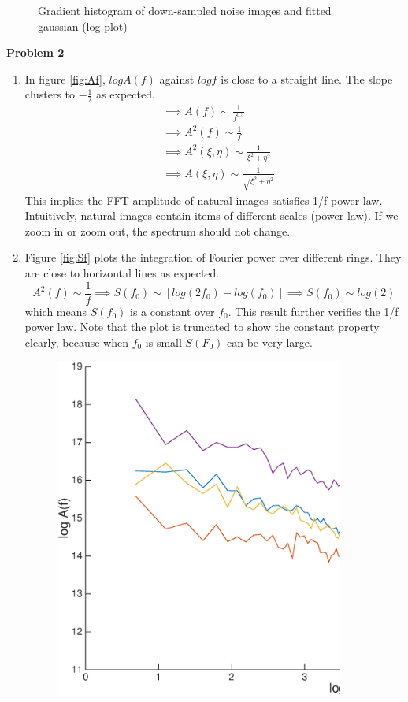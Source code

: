 \documentclass[11pt, oneside]{article}   	%
\begin{document}
\begin{enumerate}
\begin{figure}[H]
	\caption{Gradient histogram of down-sampled noise images and fitted gaussian (log-plot)}
	\label {fig:addlog}
\end{figure}
\end{enumerate}

{\bf Problem 2}
\begin{enumerate}
\item In figure \ref{fig:Af}, $log A(f)$ against $log f$ is close to a straight line. The slope clusters to $-\frac{1}{2}$ as expected.
\[\begin {aligned}
& \implies A(f) \sim \frac{1}{f^{0.5}} \\
& \implies A^2(f) \sim \frac{1}{f} \\
& \implies A^2(\xi, \eta) \sim \frac{1}{\xi^2+\eta^2} \\
& \implies A(\xi, \eta) \sim \frac{1}{\sqrt{\xi^2+\eta^2}}
\end{aligned}\]
This implies the FFT amplitude of natural images satisfies 1/f power law. Intuitively, natural images contain items of different scales (power law). If we zoom in or zoom out, the spectrum should not change. \par
\item Figure \ref{fig:Sf} plots the integration of Fourier power over different rings. They are close to horizontal lines as expected.
\[A^2(f) \sim \frac{1}{f} \implies S(f_0) \sim [log(2f_0) - log(f_0)] \implies S(f_0) \sim log(2)\]
which means $S(f_0)$ is a constant over $f_0$. This result further verifies the 1/f power law. Note that the plot is  truncated to show the constant property clearly, because when $f_0$ is small $S(F_0)$ can be very large.
\begin{figure}[H]
	\centering
	\includegraphics[width=0.9\textwidth]{Af}

\end{figure}
\end{enumerate}
\end{document}

